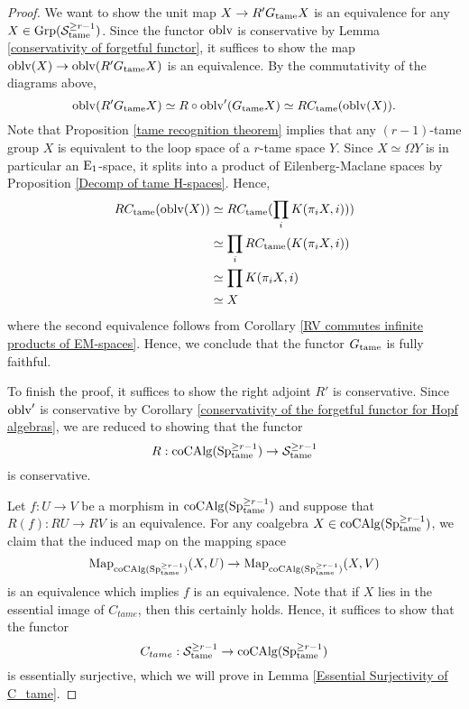 \begin{proof}
We want to show the unit map $X \to R' G_{\operatorname{\operatorname{tame}}}X$ is an equivalence for any $X\in \operatorname{Grp}({\mathcal{S}}^{\geq r-1}_{\operatorname{\operatorname{tame}}})$.
Since the functor $\operatorname{oblv}$ is conservative by Lemma \ref{conservativity of forgetful functor}, it suffices to show the map $\operatorname{oblv}(X) \to \operatorname{oblv}(R'G_{\operatorname{\operatorname{tame}}}X)$ is an equivalence.
By the commutativity of the diagrams above, 
$$
\operatorname{oblv}(R'G_{\operatorname{\operatorname{tame}}}X) \simeq R \circ \operatorname{oblv}'(G_{\operatorname{\operatorname{tame}}}X)\simeq RC_{\operatorname{\operatorname{tame}}}(\operatorname{oblv}(X)).
$$
	Note that Proposition \ref{tame recognition theorem} implies that any  $(r-1)$-tame group $X$ is equivalent to the loop space of a $r$-tame space $Y$. Since $X\simeq \Omega Y$ is in particular an $\operatorname{E}_1$-space, it splits into a product of Eilenberg-Maclane spaces by Proposition \ref{Decomp of tame H-spaces}. Hence, 
		\begin{align*}
		RC_{\operatorname{\operatorname{tame}}}(\operatorname{oblv}(X)) & \simeq RC_{\operatorname{\operatorname{tame}}}(\prod_{i} K(\pi_i X, i)))\\
		& \simeq \prod_{i} RC_{\operatorname{\operatorname{tame}}}(K(\pi_i X, i))\\
		& \simeq \prod K(\pi_i X, i)\\
		& \simeq X
	\end{align*}
	where the second equivalence follows from Corollary \ref{RV commutes infinite products of EM-spaces}.
	Hence, we conclude that the functor $G_{\operatorname{\operatorname{tame}}}$ is fully faithful.
	
	To finish the proof, it suffices to show the right adjoint $R'$ is conservative. 
	Since $\operatorname{oblv}'$ is conservative by Corollary \ref{conservativity of the forgetful functor for Hopf algebras}, we are reduced to showing that the functor 
	\[
	R: \operatorname{coCAlg}(\operatorname{Sp}^{\geq r-1}_{\operatorname{\operatorname{tame}}}) \to 
	{\mathcal{S}}^{\geq r-1}_{\operatorname{\operatorname{tame}}}
	\]
	is conservative.
	
	Let $f:U\to V$ be a morphism in $\operatorname{coCAlg}(\operatorname{Sp}^{\geq r-1}_{\operatorname{\operatorname{tame}}})$ and suppose that $R(f): RU\to RV$ is an equivalence.
	For any coalgebra $X\in \operatorname{coCAlg}(\operatorname{Sp}^{\geq r-1}_{\operatorname{\operatorname{tame}}})$, we claim that the induced map on the mapping space
	$$
	\operatorname{Map}_{\operatorname{coCAlg}(\operatorname{Sp}^{\geq r-1}_{\operatorname{\operatorname{tame}}})}(X, U)\to 
	\operatorname{Map}_{\operatorname{coCAlg}(\operatorname{Sp}^{\geq r-1}_{\operatorname{\operatorname{tame}}})}(X, V)
	$$
	is an equivalence which implies $f$ is an equivalence.
	Note that if $X$ lies in the essential image of $C_{tame}$, then this certainly holds. Hence, it suffices to show that the functor
	$$
	C_{tame}: {\mathcal{S}}^{\geq r-1}_{\operatorname{\operatorname{tame}}}  
	\to 
	\operatorname{coCAlg}(\operatorname{Sp}^{\geq r-1}_{\operatorname{\operatorname{tame}}})
	$$
	is essentially surjective, which we will prove in Lemma \ref{Essential Surjectivity of C_tame}.
	
\end{proof}

